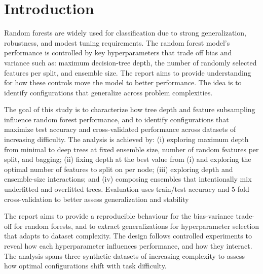 \documentclass[conference]{IEEEtran}
\begin{document}
\section{Introduction}

Random forests are widely used for classification due to strong generalization, robustness, and modest tuning requirements. The random forest model's  
performance is controlled by key hyperparameters that trade off bias and variance such as: maximum decision-tree depth, the number of 
randomly selected features per split, and ensemble size. The report aims to provide understanding for how these controls move the model to better 
performance. The idea is to identify configurations that generalize across problem complexities.

The goal of this study is to characterize how tree depth and feature subsampling influence random forest performance, and to identify 
configurations that maximize test accuracy and cross-validated performance across datasets of increasing difficulty. The analysis is achieved by: 
(i) exploring maximum depth from minimal to deep trees at fixed ensemble size, number of random features per split, and bagging; (ii) fixing 
depth at the best value from (i) and exploring the optimal number of features to split on per node; (iii) exploring depth and ensemble-size 
interactions; and (iv) composing ensembles that intentionally mix underfitted and overfitted trees. Evaluation uses train/test accuracy and 
5-fold cross-validation to better assess generalization and stability

The report aims to provide a reproducible behaviour for the bias-variance trade-off for random forests, and to extract 
generalizations for hyperparameter selection that adapts to dataset complexity. The design follows controlled experiments to reveal 
how each hyperparameter influences performance, and how they interact. The analysis spans three synthetic datasets of increasing complexity to
assess how optimal configurations shift with task difficulty.
\end{document}
